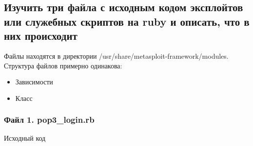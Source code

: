 \documentclass[a4paper, 14pt]{article}				%
\begin{document}
\subsection{Изучить три файла с исходным кодом эксплойтов или служебных скриптов на ruby и описать, что в них происходит}
Файлы находятся в директории /usr/share/metasploit-framework/modules.
Структура файлов примерно одинакова:\\
\begin{itemize}
\item{Зависимости}
\item{Класс}
\end{itemize}

\subsubsection{Файл 1. pop3\_login.rb }
Исходный код
\end{document}
